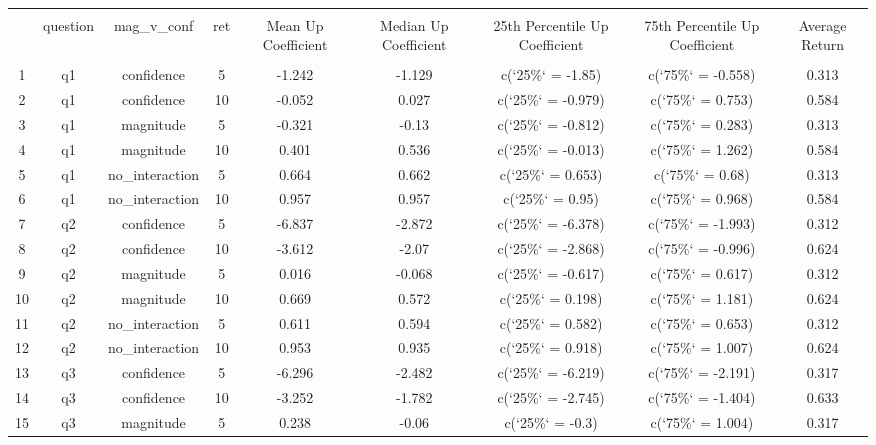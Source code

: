 
\begin{table}[!htbp] \centering 
  \caption{} 
  \label{} 
\begin{tabular}{@{\extracolsep{5pt}} ccccccccc} 
\\[-1.8ex]\hline 
\hline \\[-1.8ex] 
 & question & mag\_v\_conf & ret & Mean Up Coefficient & Median Up Coefficient & 25th Percentile Up Coefficient & 75th Percentile Up Coefficient & Average Return \\ 
\hline \\[-1.8ex] 
1 & q1 & confidence & 5 & -1.242 & -1.129 & c(`25\%` = -1.85) & c(`75\%` = -0.558) & 0.313 \\ 
2 & q1 & confidence & 10 & -0.052 & 0.027 & c(`25\%` = -0.979) & c(`75\%` = 0.753) & 0.584 \\ 
3 & q1 & magnitude & 5 & -0.321 & -0.13 & c(`25\%` = -0.812) & c(`75\%` = 0.283) & 0.313 \\ 
4 & q1 & magnitude & 10 & 0.401 & 0.536 & c(`25\%` = -0.013) & c(`75\%` = 1.262) & 0.584 \\ 
5 & q1 & no\_interaction & 5 & 0.664 & 0.662 & c(`25\%` = 0.653) & c(`75\%` = 0.68) & 0.313 \\ 
6 & q1 & no\_interaction & 10 & 0.957 & 0.957 & c(`25\%` = 0.95) & c(`75\%` = 0.968) & 0.584 \\ 
7 & q2 & confidence & 5 & -6.837 & -2.872 & c(`25\%` = -6.378) & c(`75\%` = -1.993) & 0.312 \\ 
8 & q2 & confidence & 10 & -3.612 & -2.07 & c(`25\%` = -2.868) & c(`75\%` = -0.996) & 0.624 \\ 
9 & q2 & magnitude & 5 & 0.016 & -0.068 & c(`25\%` = -0.617) & c(`75\%` = 0.617) & 0.312 \\ 
10 & q2 & magnitude & 10 & 0.669 & 0.572 & c(`25\%` = 0.198) & c(`75\%` = 1.181) & 0.624 \\ 
11 & q2 & no\_interaction & 5 & 0.611 & 0.594 & c(`25\%` = 0.582) & c(`75\%` = 0.653) & 0.312 \\ 
12 & q2 & no\_interaction & 10 & 0.953 & 0.935 & c(`25\%` = 0.918) & c(`75\%` = 1.007) & 0.624 \\ 
13 & q3 & confidence & 5 & -6.296 & -2.482 & c(`25\%` = -6.219) & c(`75\%` = -2.191) & 0.317 \\ 
14 & q3 & confidence & 10 & -3.252 & -1.782 & c(`25\%` = -2.745) & c(`75\%` = -1.404) & 0.633 \\ 
15 & q3 & magnitude & 5 & 0.238 & -0.06 & c(`25\%` = -0.3) & c(`75\%` = 1.004) & 0.317 \\ 

\end{tabular}
\end{table}
